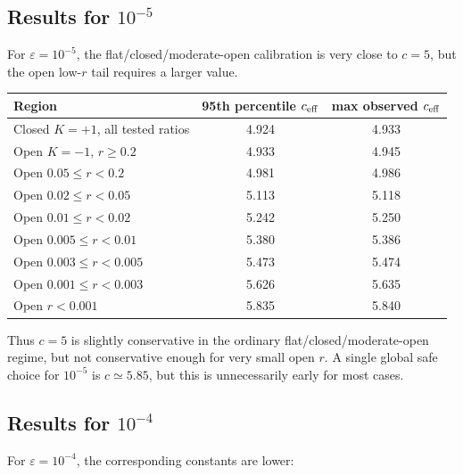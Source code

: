 \documentclass[11pt]{article}
\begin{document}
\subsection{Results for \texorpdfstring{\(10^{-5}\)}{1e-5}}

For \(\varepsilon=10^{-5}\), the flat/closed/moderate-open calibration is very
close to \(c=5\), but the open low-\(r\) tail requires a larger value.

\begin{center}
\begin{tabular}{lcc}
\toprule
Region & 95th percentile \(c_{\rm eff}\) & max observed \(c_{\rm eff}\) \\
\midrule
Closed \(K=+1\), all tested ratios & 4.924 & 4.933 \\
Open \(K=-1\), \(r\ge0.2\) & 4.933 & 4.945 \\
Open \(0.05\le r<0.2\) & 4.981 & 4.986 \\
Open \(0.02\le r<0.05\) & 5.113 & 5.118 \\
Open \(0.01\le r<0.02\) & 5.242 & 5.250 \\
Open \(0.005\le r<0.01\) & 5.380 & 5.386 \\
Open \(0.003\le r<0.005\) & 5.473 & 5.474 \\
Open \(0.001\le r<0.003\) & 5.626 & 5.635 \\
Open \(r<0.001\) & 5.835 & 5.840 \\
\bottomrule
\end{tabular}
\end{center}

Thus \(c=5\) is slightly conservative in the ordinary flat/closed/moderate-open
regime, but not conservative enough for very small open \(r\).  A single global
safe choice for \(10^{-5}\) is \(c\simeq5.85\), but this is unnecessarily early
for most cases.

\subsection{Results for \texorpdfstring{\(10^{-4}\)}{1e-4}}

For \(\varepsilon=10^{-4}\), the corresponding constants are lower:
\end{document}
